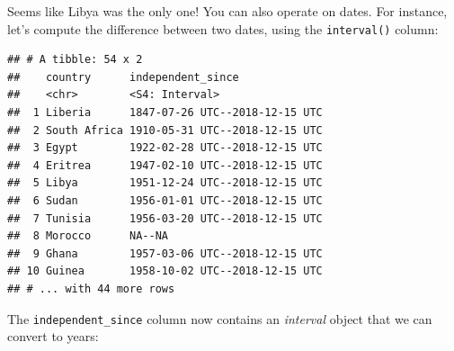 \documentclass[]{gitbook}
\newenvironment{Shaded}{\begin{snugshade}}{\end{snugshade}}
\newcommand{\DataTypeTok}[1]{\textcolor[rgb]{0.13,0.29,0.53}{#1}}
\newcommand{\KeywordTok}[1]{\textcolor[rgb]{0.13,0.29,0.53}{\textbf{#1}}}
\newcommand{\NormalTok}[1]{#1}
\newcommand{\OperatorTok}[1]{\textcolor[rgb]{0.81,0.36,0.00}{\textbf{#1}}}
\newcommand{\StringTok}[1]{\textcolor[rgb]{0.31,0.60,0.02}{#1}}
\theoremstyle{definition}
\theoremstyle{definition}
\theoremstyle{definition}
\theoremstyle{remark}
\begin{document}
Seems like Libya was the only one! You can also operate on dates. For
instance, let's compute the difference between two dates, using the
\texttt{interval()} column:

\begin{Shaded}
\end{Shaded}

\begin{verbatim}
## # A tibble: 54 x 2
##    country      independent_since             
##    <chr>        <S4: Interval>                
##  1 Liberia      1847-07-26 UTC--2018-12-15 UTC
##  2 South Africa 1910-05-31 UTC--2018-12-15 UTC
##  3 Egypt        1922-02-28 UTC--2018-12-15 UTC
##  4 Eritrea      1947-02-10 UTC--2018-12-15 UTC
##  5 Libya        1951-12-24 UTC--2018-12-15 UTC
##  6 Sudan        1956-01-01 UTC--2018-12-15 UTC
##  7 Tunisia      1956-03-20 UTC--2018-12-15 UTC
##  8 Morocco      NA--NA                        
##  9 Ghana        1957-03-06 UTC--2018-12-15 UTC
## 10 Guinea       1958-10-02 UTC--2018-12-15 UTC
## # ... with 44 more rows
\end{verbatim}

The \texttt{independent\_since} column now contains an \emph{interval}
object that we can convert to years:

\begin{Shaded}
\end{Shaded}
\end{document}

